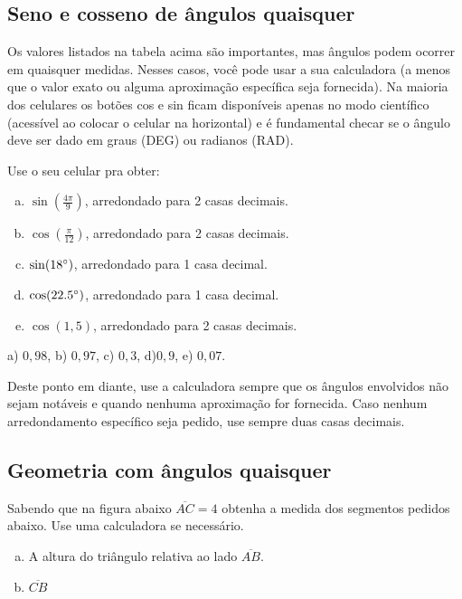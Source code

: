 \documentclass[main.tex]{subfiles}
\begin{document}
\subsection*{Seno e cosseno de ângulos quaisquer}

Os valores listados na tabela acima são importantes, mas ângulos podem ocorrer em quaisquer medidas. Nesses casos, você pode usar a sua calculadora (a menos que o valor exato ou alguma aproximação específica seja fornecida). Na maioria dos celulares os botões cos e sin ficam disponíveis apenas no modo científico (acessível ao colocar o celular na horizontal) e é fundamental checar se o ângulo deve ser dado em graus (DEG) ou radianos (RAD).

\begin{questao}
Use o seu celular pra obter:
\begin{enumerate}[a)]
\item $\sin(\frac{4\pi}{9})$, arredondado para 2 casas decimais.
\item $\cos(\frac{\pi}{12})$, arredondado para 2 casas decimais.
\item $\sin(18\degree)$, arredondado para 1 casa decimal.
\item $\cos(22.5\degree)$, arredondado para 1 casa decimal.
\item $\cos(1,5)$, arredondado para 2 casas decimais.
\end{enumerate}
\end{questao}

\begin{gabarito}
	\begin{gabaritoQuestao}
		a) $0,98$, b) $0,97$, c) $0,3$, d)$0,9$, e) $0,07$.
	\end{gabaritoQuestao}
\end{gabarito}

Deste ponto em diante, use a calculadora sempre que os ângulos envolvidos não sejam notáveis e quando nenhuma aproximação for fornecida. Caso nenhum arredondamento específico seja pedido, use sempre duas casas decimais.

\subsection*{Geometria com ângulos quaisquer}

\begin{questao}
Sabendo que na figura abaixo $\overline{AC}=4$ obtenha a medida dos segmentos pedidos abaixo. Use uma calculadora se necessário.
\begin{enumerate}[a)]
\item A altura do triângulo relativa ao lado $\overline{AB}$.
\item $\overline{CB}$
\end{enumerate}
\end{questao}
\end{document}
